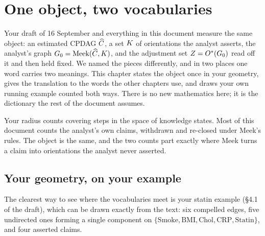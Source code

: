 \chapter{One object, two vocabularies}
\label{ch:vocabulary}

Your draft of 16 September and everything in this document measure the same object: an estimated
CPDAG $\widehat{C}$, a set $K$ of orientations the analyst asserts, the analyst's graph
$G_0 = \mathrm{Meek}(\widehat{C}, K)$, and the adjustment set $Z = O^{*}(G_0)$ read off it and then held
fixed. We named the pieces differently, and in two places one word carries two meanings. This chapter
states the object once in your geometry, gives the translation to the words the other chapters use,
and draws your own running example counted both ways. There is no new mathematics here; it is the
dictionary the rest of the document assumes.

\begin{ideia}
Your radius counts covering steps in the space of knowledge states. Most of this document counts the
analyst's own claims, withdrawn and re-closed under Meek's rules. The object is the same, and the two
counts part exactly where Meek turns a claim into orientations the analyst never asserted.
\end{ideia}

\begin{antes}
\end{antes}

\section{Your geometry, on your example}

The clearest way to see where the vocabularies meet is your statin example (\S4.1 of the draft), which
can be drawn exactly from the text: six compelled edges, five undirected ones forming a single component
on $\{\text{Smoke}, \text{BMI}, \text{Chol}, \text{CRP}, \text{Statin}\}$, and four asserted claims.

